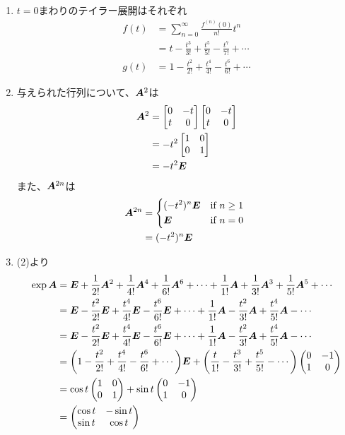 \begin{ans*}
  ${}$
  \begin{enumerate}[label=(\arabic*)]
    \item $t=0$まわりのテイラー展開はそれぞれ
    \begin{align}
      f(t)
      &= \sum_{n=0}^{\infty} \frac{f^{(n)}(0)}{n!} t^n \\
      &= t - \frac{t^3}{3!} + \frac{t^5}{5!} - \frac{t^7}{7!} + \cdots \\
      g(t)
      &= 1 - \frac{t^2}{2!} + \frac{t^4}{4!} - \frac{t^6}{6!} + \cdots
    \end{align}
    \item 与えられた行列について、$\bm{A}^2$は
    \begin{align}
      \bm{A}^2
      &=
      \begin{bmatrix}
        0 & -t \\
        t & 0
      \end{bmatrix}
      \begin{bmatrix}
        0 & -t \\
        t & 0
      \end{bmatrix} \\
      &= -t^2
      \begin{bmatrix}
        1 & 0 \\
        0 & 1
      \end{bmatrix} \\
      &= -t^2 \bm{E}
    \end{align}
    また、$\bm{A}^{2n}$は
    \begin{align}
      \bA^{2n}
      &=
      \begin{dcases*}
        (-t^{2})^{n}\bE & if $n\geq 1$ \\
        \bE & if $n = 0$
      \end{dcases*} \\
      &= (-t^{2})^{n}\bE
    \end{align}
    \item (2)より
    \begin{align}
      \exp\bm{A}
      &=
      \bm{E} + \frac{1}{2!}\bm{A}^2 + \frac{1}{4!}\bm{A}^4 + \frac{1}{6!}\bm{A}^6 + \cdots
      + \frac{1}{1!}\bm{A} + \frac{1}{3!}\bm{A}^3 + \frac{1}{5!}\bm{A}^5 + \cdots \\
      &=
      \bm{E} - \frac{t^2}{2!}\bm{E} + \frac{t^4}{4!}\bm{E} - \frac{t^6}{6!}\bm{E} + \cdots
      + \frac{1}{1!}\bm{A} - \frac{t^2}{3!}\bm{A} + \frac{t^4}{5!}\bm{A} - \cdots \\
      &=
      \bm{E} - \frac{t^2}{2!}\bm{E} + \frac{t^4}{4!}\bm{E} - \frac{t^6}{6!}\bm{E} + \cdots
      + \frac{1}{1!}\bm{A} - \frac{t^2}{3!}\bm{A} + \frac{t^4}{5!}\bm{A} - \cdots \\
      &=
      \biggl(1 - \frac{t^2}{2!} + \frac{t^4}{4!} - \frac{t^6}{6!} + \cdots \biggr)\bm{E}
      + \biggl(\frac{t}{1!} - \frac{t^3}{3!} + \frac{t^5}{5!} - \cdots \biggr)
      \begin{pmatrix}
        0 & -1 \\
        1 & 0
      \end{pmatrix} \\
      &=
      \cos t
      \begin{pmatrix}
        1 & 0 \\
        0 & 1
      \end{pmatrix}
      +
      \sin t
      \begin{pmatrix}
        0 & -1 \\
        1 & 0
      \end{pmatrix} \\
      &=
      \begin{pmatrix}
        \cos t & -\sin t \\
        \sin t & \cos t
      \end{pmatrix}
    \end{align}


\end{enumerate}
\end{ans*}
